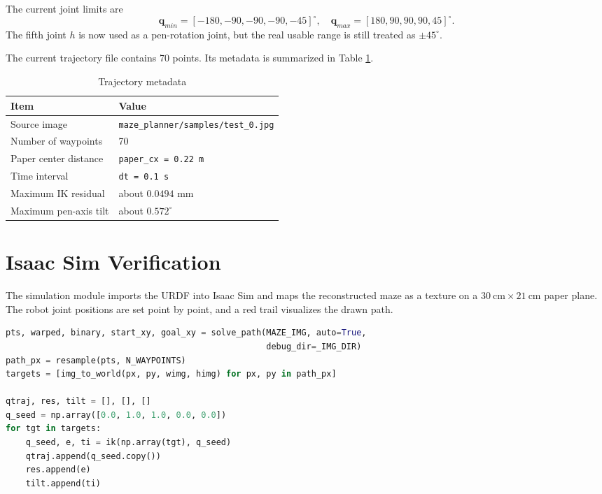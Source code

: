 \documentclass[a4paper,12pt]{article}
\begin{document}
The current joint limits are
\[
  \mathbf{q}_{min}=[-180,-90,-90,-90,-45]^\circ,\quad
  \mathbf{q}_{max}=[180,90,90,90,45]^\circ .
\]
The fifth joint $h$ is now used as a pen-rotation joint, but the real usable range is still treated as $\pm45^\circ$.

The current trajectory file contains 70 points. Its metadata is summarized in Table \ref{tab:traj_meta}.

\begin{table}[H]
  \centering
  \caption{Trajectory metadata}
  \label{tab:traj_meta}
  \begin{tabular}{ll}
    \toprule
    Item & Value \\
    \midrule
    Source image & \texttt{maze\_planner/samples/test\_0.jpg} \\
    Number of waypoints & 70 \\
    Paper center distance & \texttt{paper\_cx = 0.22 m} \\
    Time interval & \texttt{dt = 0.1 s} \\
    Maximum IK residual & about $0.0494$ mm \\
    Maximum pen-axis tilt & about $0.572^\circ$ \\
    \bottomrule
  \end{tabular}
\end{table}

\section{Isaac Sim Verification}

The simulation module imports the URDF into Isaac Sim and maps the reconstructed maze as a texture on a $30\ \mathrm{cm} \times 21\ \mathrm{cm}$ paper plane. The robot joint positions are set point by point, and a red trail visualizes the drawn path.

\begin{lstlisting}[language=Python, caption={Simulation trajectory generation}]
pts, warped, binary, start_xy, goal_xy = solve_path(MAZE_IMG, auto=True,
                                                    debug_dir=_IMG_DIR)
path_px = resample(pts, N_WAYPOINTS)
targets = [img_to_world(px, py, wimg, himg) for px, py in path_px]

qtraj, res, tilt = [], [], []
q_seed = np.array([0.0, 1.0, 1.0, 0.0, 0.0])
for tgt in targets:
    q_seed, e, ti = ik(np.array(tgt), q_seed)
    qtraj.append(q_seed.copy())
    res.append(e)
    tilt.append(ti)
\end{lstlisting}
\end{document}
